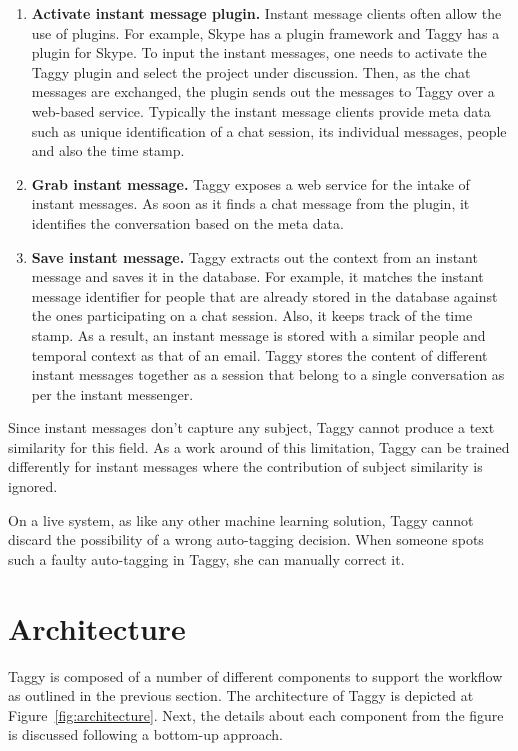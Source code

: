\begin{enumerate}
	\item \textbf{Activate instant message plugin.} Instant message clients often allow the use of plugins. For example, Skype \cite{skype} has a plugin framework and Taggy has a plugin for Skype. To input the instant messages, one needs to activate the Taggy plugin and select the project under discussion. Then, as the chat messages are exchanged, the plugin sends out the messages to Taggy over a web-based service. Typically the instant message clients provide meta data such as unique identification of a chat session, its individual messages, people and also the time stamp.

	\item \textbf{Grab instant message.} Taggy exposes a web service for the intake of instant messages. As soon as it finds a chat message from the plugin, it identifies the conversation based on the meta data.
	
	\item \textbf{Save instant message.} Taggy extracts out the context from an instant message and saves it in the database. For example, it matches the instant message identifier for people that are already stored in the database against the ones participating on a chat session. Also, it keeps track of the time stamp. As a result, an instant message is stored with a similar people and temporal context as that of an email. Taggy stores the content of different instant messages together as a session that belong to a single conversation as per the instant messenger.
\end{enumerate}

Since instant messages don't capture any subject, Taggy cannot produce a text similarity for this field. As a work around of this limitation, Taggy can be trained differently for instant messages where the contribution of subject similarity is ignored.

On a live system, as like any other machine learning solution, Taggy cannot discard the possibility of a wrong auto-tagging decision. When someone spots such a faulty auto-tagging in Taggy, she can manually correct it.

\section{Architecture}
Taggy is composed of a number of different components to support the workflow as outlined in the previous section. The architecture of Taggy is depicted at Figure~\ref{fig:architecture}. Next, the details about each component from the figure is discussed following a bottom-up approach.


